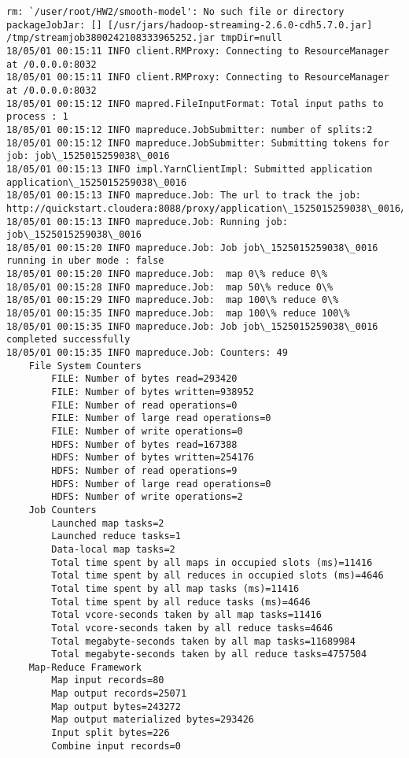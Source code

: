 \documentclass[11pt]{article}
\begin{document}
    \begin{Verbatim}[commandchars=\\\{\}]
rm: `/user/root/HW2/smooth-model': No such file or directory
packageJobJar: [] [/usr/jars/hadoop-streaming-2.6.0-cdh5.7.0.jar] /tmp/streamjob3800242108333965252.jar tmpDir=null
18/05/01 00:15:11 INFO client.RMProxy: Connecting to ResourceManager at /0.0.0.0:8032
18/05/01 00:15:11 INFO client.RMProxy: Connecting to ResourceManager at /0.0.0.0:8032
18/05/01 00:15:12 INFO mapred.FileInputFormat: Total input paths to process : 1
18/05/01 00:15:12 INFO mapreduce.JobSubmitter: number of splits:2
18/05/01 00:15:12 INFO mapreduce.JobSubmitter: Submitting tokens for job: job\_1525015259038\_0016
18/05/01 00:15:13 INFO impl.YarnClientImpl: Submitted application application\_1525015259038\_0016
18/05/01 00:15:13 INFO mapreduce.Job: The url to track the job: http://quickstart.cloudera:8088/proxy/application\_1525015259038\_0016/
18/05/01 00:15:13 INFO mapreduce.Job: Running job: job\_1525015259038\_0016
18/05/01 00:15:20 INFO mapreduce.Job: Job job\_1525015259038\_0016 running in uber mode : false
18/05/01 00:15:20 INFO mapreduce.Job:  map 0\% reduce 0\%
18/05/01 00:15:28 INFO mapreduce.Job:  map 50\% reduce 0\%
18/05/01 00:15:29 INFO mapreduce.Job:  map 100\% reduce 0\%
18/05/01 00:15:35 INFO mapreduce.Job:  map 100\% reduce 100\%
18/05/01 00:15:35 INFO mapreduce.Job: Job job\_1525015259038\_0016 completed successfully
18/05/01 00:15:35 INFO mapreduce.Job: Counters: 49
	File System Counters
		FILE: Number of bytes read=293420
		FILE: Number of bytes written=938952
		FILE: Number of read operations=0
		FILE: Number of large read operations=0
		FILE: Number of write operations=0
		HDFS: Number of bytes read=167388
		HDFS: Number of bytes written=254176
		HDFS: Number of read operations=9
		HDFS: Number of large read operations=0
		HDFS: Number of write operations=2
	Job Counters 
		Launched map tasks=2
		Launched reduce tasks=1
		Data-local map tasks=2
		Total time spent by all maps in occupied slots (ms)=11416
		Total time spent by all reduces in occupied slots (ms)=4646
		Total time spent by all map tasks (ms)=11416
		Total time spent by all reduce tasks (ms)=4646
		Total vcore-seconds taken by all map tasks=11416
		Total vcore-seconds taken by all reduce tasks=4646
		Total megabyte-seconds taken by all map tasks=11689984
		Total megabyte-seconds taken by all reduce tasks=4757504
	Map-Reduce Framework
		Map input records=80
		Map output records=25071
		Map output bytes=243272
		Map output materialized bytes=293426
		Input split bytes=226
		Combine input records=0

\end{Verbatim}
\end{document}
